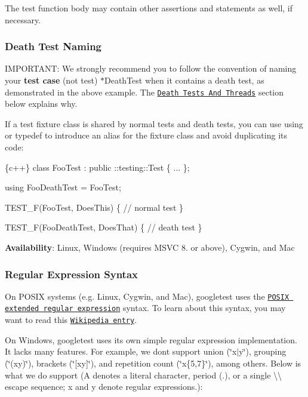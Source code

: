 The test function body may contain other assertions and statements as well, if necessary.

\subsubsection*{Death Test Naming}

I\+M\+P\+O\+R\+T\+A\+NT\+: We strongly recommend you to follow the convention of naming your {\bfseries test case} (not test) {\ttfamily $\ast$\+Death\+Test} when it contains a death test, as demonstrated in the above example. The \href{#death-tests-and-threads}{\tt Death Tests And Threads} section below explains why.

If a test fixture class is shared by normal tests and death tests, you can use {\ttfamily using} or {\ttfamily typedef} to introduce an alias for the fixture class and avoid duplicating its code\+:


\begin{DoxyCode}
\{c++\}
class FooTest : public ::testing::Test \{ ... \};

using FooDeathTest = FooTest;

TEST\_F(FooTest, DoesThis) \{
  // normal test
\}

TEST\_F(FooDeathTest, DoesThat) \{
  // death test
\}
\end{DoxyCode}


{\bfseries Availability}\+: Linux, Windows (requires M\+S\+VC 8. or above), Cygwin, and Mac

\subsubsection*{Regular Expression Syntax}

On P\+O\+S\+IX systems (e.\+g. Linux, Cygwin, and Mac), googletest uses the \href{http://www.opengroup.org/onlinepubs/009695399/basedefs/xbd_chap09.html#tag_09_04}{\tt P\+O\+S\+IX extended regular expression} syntax. To learn about this syntax, you may want to read this \href{http://en.wikipedia.org/wiki/Regular_expression#POSIX_Extended_Regular_Expressions}{\tt Wikipedia entry}.

On Windows, googletest uses its own simple regular expression implementation. It lacks many features. For example, we don\textquotesingle{}t support union ({\ttfamily \char`\"{}x$\vert$y\char`\"{}}), grouping ({\ttfamily \char`\"{}(xy)\char`\"{}}), brackets ({\ttfamily \char`\"{}\mbox{[}xy\mbox{]}\char`\"{}}), and repetition count ({\ttfamily \char`\"{}x\{5,7\}\char`\"{}}), among others. Below is what we do support ({\ttfamily A} denotes a literal character, period ({\ttfamily .}), or a single {\ttfamily \textbackslash{}\textbackslash{}} escape sequence; {\ttfamily x} and {\ttfamily y} denote regular expressions.)\+:

